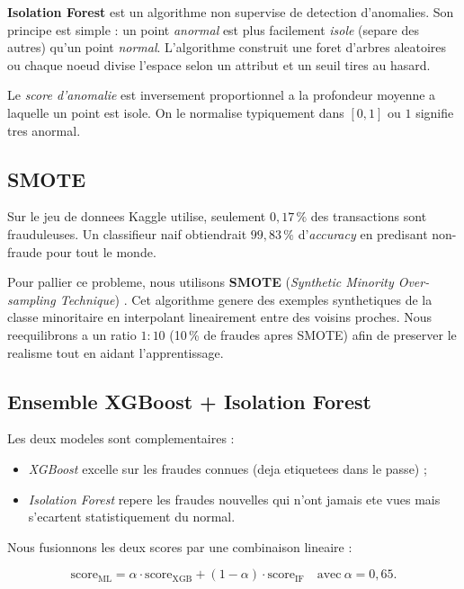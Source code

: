 \documentclass[12pt,a4paper,oneside]{report}
\begin{document}
\textbf{Isolation Forest} \cite{liu2008isolation} est un algorithme non
supervise de detection d'anomalies. Son principe est simple : un point
\emph{anormal} est plus facilement \emph{isole} (separe des autres) qu'un
point \emph{normal}. L'algorithme construit une foret d'arbres aleatoires ou
chaque noeud divise l'espace selon un attribut et un seuil tires au hasard.

Le \emph{score d'anomalie} est inversement proportionnel a la profondeur
moyenne a laquelle un point est isole. On le normalise typiquement dans
$[0, 1]$ ou $1$ signifie tres anormal.

\subsection{SMOTE}

Sur le jeu de donnees Kaggle utilise, seulement $0{,}17\,\%$ des transactions
sont frauduleuses. Un classifieur naif obtiendrait $99{,}83\,\%$
d'\emph{accuracy} en predisant \og non-fraude\fg{} pour tout le monde.

Pour pallier ce probleme, nous utilisons \textbf{SMOTE} (\emph{Synthetic
Minority Over-sampling Technique}) \cite{chawla2002smote}. Cet algorithme
genere des exemples synthetiques de la classe minoritaire en interpolant
lineairement entre des voisins proches. Nous reequilibrons a un ratio
$1{:}10$ (10\,\% de fraudes apres SMOTE) afin de preserver le realisme tout
en aidant l'apprentissage.

\subsection{Ensemble XGBoost + Isolation Forest}

Les deux modeles sont complementaires :

\begin{itemize}[leftmargin=*]
  \item \emph{XGBoost} excelle sur les fraudes \og connues \fg{} (deja
        etiquetees dans le passe) ;
  \item \emph{Isolation Forest} repere les fraudes \og nouvelles \fg{} qui
        n'ont jamais ete vues mais s'ecartent statistiquement du normal.
\end{itemize}

Nous fusionnons les deux scores par une combinaison lineaire :

\begin{equation}
  \text{score}_{\text{ML}} = \alpha \cdot \text{score}_{\text{XGB}} +
                              (1 - \alpha) \cdot \text{score}_{\text{IF}}
  \quad\text{avec}~\alpha = 0{,}65.
\end{equation}
\end{document}
